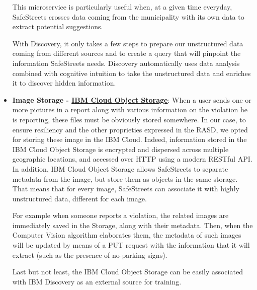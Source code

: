 \begin{itemize}
	This microservice is particularly useful when, at a given time everyday, SafeStreets crosses data coming from the municipality with its own data to extract potential suggestions.
	
	With Discovery, it only takes a few steps to prepare our unstructured data coming from different sources and to create a query that will pinpoint the information SafeStreets needs. Discovery automatically uses data analysis combined with cognitive intuition to take the unstructured data and enriches it to discover hidden information.
	
	\item \textbf{Image Storage - \href{https://cloud.ibm.com/catalog/services/cloud-object-storage}{IBM Cloud Object Storage}}: \hypertarget{cloudObjectStorage}{} When a user sends one or more pictures in a report along with various information on the violation he is reporting, these files must be obviously stored somewhere. In our case, to ensure resiliency and the other proprieties expressed in the RASD, we opted for storing these image in the IBM Cloud. Indeed, information stored in the IBM Cloud Object Storage is encrypted and dispersed across multiple geographic locations, and accessed over HTTP using a modern RESTful API.
	In addition, IBM Cloud Object Storage allows SafeStreets to separate metadata from the image, but store them as objects in the same storage. That means that for every image, SafeStreets can associate it with highly unstructured data, different for each image. 
	
	For example when someone reports a violation, the related images are immediately saved in the Storage, along with their metadata. Then, when the Computer Vision algorithm elaborates them, the metadata of such images will be updated by means of a PUT request with the information that it will extract (such as the presence of no-parking signs).
	
	Last but not least, the IBM Cloud Object Storage can be easily associated with IBM Discovery as an external source for training.
	

\end{itemize}
